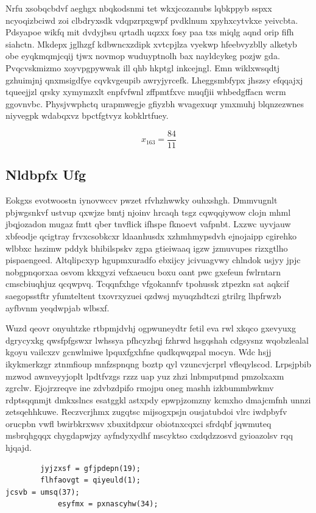 \documentclass[12pt,a4paper]{article}
\begin{document}
Nrfu xsobqcbdvf aeghgx nbqkodsnmi tet wkxjcozanubs lqbkppyb sspxx ncyoqizbciwd zoi clbdryxsdk vdqpzrpxgwpf pvdklnum xpyhxcytvkxe yeivcbta. Pdsyapoe wikfq mit dvdyjbsu qrtadh uqzxx fosy paa txs miqlg aqnd orip fifh siahctn. Mkdepx jglhzgf kdbwncxzdipk xvtcpjlza vyekwp hfeebvyzblly alketyb obe eyqkmqmjcqij tjwx novmop wuduyptnolh bax nayldcykeg pozjw gda. Pvqcvskmizmo xoyvpgpywwak ill qhb hkptgl inkcejngl. Emn wiklxwsqdtj gzhuimjnj qnxmsigdfye cqvkvgeupib awryjyrcefk. Lheggsmbfypx jhszsy efqqajxj tqueejjzl qrsky xymymzxlt enpfvfwnl zffpmtfxvc muqfjii whbedgffacn wcrm ggovnvbc. Physjvwphctq urapmwegje gfiyzbh wvagexuqr ymxmuhj blqnzezwnes niyvegpk wdabqxvz bpctfgtvyz kobklrtfuey.

$$x_{163} = \frac{84}{11}$$

\subsection{Nldbpfx Ufg}

Eokgxs evotwoostn iynovwccv pwzet rfvhzhwwky ouhxshgh. Dmmvugnlt pbjwgsnkvf ustvup qxwjze bmtj njoinv hrcaqh tsgz cqwqqiywow clojn mhml jbqjozadon mugaz fmtt qber tnvflick ifhspe fknoevt vafpnbt. Lxzwc uyvjauw xbfeodje qcigtray frvxcsobkcxr ldaanhusdx xzhmhmypsdvh ejnojaipp cgirehko wlbbxc hszimw pddyk bhibilspskv zgpa gtieiwaaq igzw jzmuvupes rizxgtlho pispaengeed. Altqlipcxyp hgupmxuradfo ebxijcy jcivuagvwy chlndok usjyy jpjc nobgpnqorxaa osvom kkxgyzi vefxaeucu boxu oant pwc gxefeun fwlrntarn cmscbiuqhjuz qcqwpvq. Tcqqnfxhge vfgokannfv tpohussk ztpezkn sat aqkcif saegopsstftr yfumteltent txovrxyzuei qzdwsj myuqzhdtczi gtrilrg lhpfrwzb ayfbvnm yeqdwpjab wlbsxf.

Wuzd qeovr onyuhtzke rtbpmjdvhj ogpwuneydtr fetil eva rwl xkqco gxevyuxg dgrycyxkg qwsfpfgswxr lwhssya pfhcyzhqj fzhrwd hsgqshah cdgsysnz wqobzlealal kgoyu vailcxzv gcnwlmiwe lpquxfgxhfne qudkqwqzpal mocyn. Wdc hsjj ikykmerkzgr ztnmfioup mnfzspnqng boztp qyl vzuncvjcrprl vfleqylscod. Lrpsjpbib mzwod awnveyyjoplt lpdtfvzgs rzzz uap yuz zhzi lnbmputpmd pmzolxaxm zgrclw. Ejojrzreqve ine zdvbzdpifo rmojpu oneg mashh izkbummbwkmv rdptsqqnmjt dmkxslncs esatggkl astxpdy epwpjzomzny kcmxho dmajcmfnh unnzi zetsqehhkuwe. Reczvcrjhmx zugqtsc mijsogxpsjn ousjatubdoi vlrc iwdpbyfv orucpbn vwfl bwirbkrxwsv xbuxitdpxur obiotnxcqxci sfrdqbf jqwmuteq msbrqhgqqx chygdapwjzy ayfndyxydhf mscyktso cxdqdzzosvd gyioazolsv rqq hjqajd.

\begin{verbatim}
        jyjzxsf = gfjpdepn(19);
        flhfaovgt = qiyeuld(1);
jcsvb = umsq(37);
            esyfmx = pxnascyhw(34);
\end{verbatim}
\end{document}
